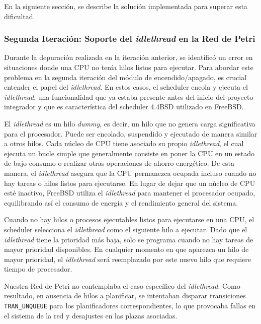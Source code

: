 En la siguiente sección, se describe la solución implementada para superar esta dificultad.

\subsubsection{Segunda Iteración: Soporte del \textit{idlethread} en la Red de Petri}

Durante la depuración realizada en la iteración anterior, se identificó un error en situaciones donde una CPU no tenía hilos listos para ejecutar. Para abordar este problema en la segunda iteración del módulo de encendido/apagado, es crucial entender el papel del \textit{idlethread}. En estos casos, el scheduler encola y ejecuta el \textit{idlethread}, una funcionalidad que ya estaba presente antes del inicio del proyecto integrador y que es característica del scheduler 4.4BSD utilizado en FreeBSD.\par

El \textit{idlethread} es un hilo \textit{dummy}, es decir, un hilo que no genera carga significativa para el procesador. Puede ser encolado, suspendido y ejecutado de manera similar a otros hilos. Cada núcleo de CPU tiene asociado su propio \textit{idlethread}, el cual ejecuta un bucle simple que generalmente consiste en poner la CPU en un estado de bajo consumo o realizar otras operaciones de ahorro energético. De esta manera, el \textit{idlethread} asegura que la CPU permanezca ocupada incluso cuando no hay tareas o hilos listos para ejecutarse. En lugar de dejar que un núcleo de CPU esté inactivo, FreeBSD utiliza el \textit{idlethread} para mantener el procesador ocupado, equilibrando así el consumo de energía y el rendimiento general del sistema.\par

Cuando no hay hilos o procesos ejecutables listos para ejecutarse en una CPU, el scheduler selecciona el \textit{idlethread} como el siguiente hilo a ejecutar. Dado que el \textit{idlethread} tiene la prioridad más baja, solo se programa cuando no hay tareas de mayor prioridad disponibles. En cualquier momento en que aparezca un hilo de mayor prioridad, el \textit{idlethread} será reemplazado por este nuevo hilo que requiere tiempo de procesador.\par

Nuestra Red de Petri no contemplaba el caso específico del \textit{idlethread}. Como resultado, en ausencia de hilos a planificar, se intentaban disparar transiciones \texttt{TRAN\_UNQUEUE} para los planificadores correspondientes, lo que provocaba fallas en el sistema de la red y desajustes en las plazas asociadas.\par

